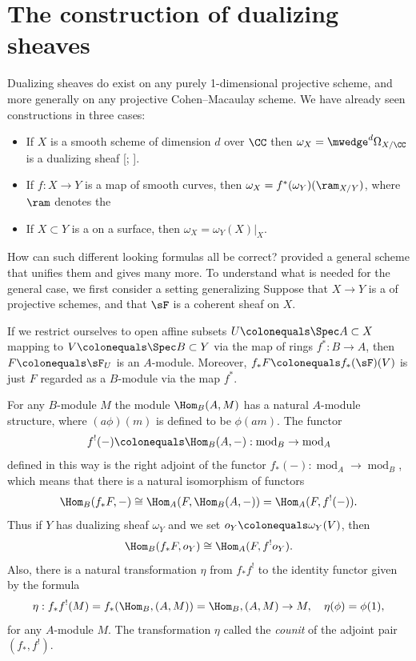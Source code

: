 \section{The construction of dualizing sheaves}
\label{dualizing sheaves section}

Dualizing sheaves do exist on any purely 1-dimensional projective scheme, 
and more generally on any projective Cohen--Macaulay scheme. We
have already seen constructions
in three
cases:

\begin{itemize}
\item If $X$ is a smooth scheme of dimension $d$ over $\CC$ then
$\omega_{X}= \mwedge^{d} \Omega_{X/\CC}$
is a dualizing sheaf
%
[;
\citeyear[p.~648, 708]{Griffiths-Harris1978}].
\item If $f: X\to Y$ is a map of smooth curves, then $\omega_{X} =
f^{*}(\omega_{Y})(\ram_{X/Y})$, where
$\ram$ denotes the
%
\item If $X\subset Y$ is a
%
on a surface, then $\omega_{X}
= \omega_{Y}(X)|_{X}$.
\end{itemize}

How can such different looking formulas all be correct?
%
provided a general scheme
that unifies them and gives many more.
To understand what is needed for the general case, we first consider a
setting generalizing
%
Suppose that $X\to Y$ is a
%
of projective schemes, and that
$\sF$ is a coherent sheaf on $X$.

If we restrict ourselves to open affine subsets
$U \colonequals \Spec A\subset X$ mapping to
$V\colonequals \Spec B\subset Y$ via the map of rings $f^{*}:B\to A$, then
$F \colonequals \sF_{U}$ is an $A$-module. Moreover,
$f_*{F} \colonequals f_*(\sF)(V)$ is just $F$ regarded as a $B$-module
via the map $f^{*}$.

For any $B$-module $M$ the module $\Hom_{B}(A, M)$ has a natural
$A$-module structure,
where $(a\phi)(m)$ is defined to be $\phi(am)$. The functor
%
$$
f^!(-)\colonequals\Hom_{B}(A,-):\operatorname{mod}_B\to\operatorname{mod}_A
$$
defined in this way is the
%
right adjoint of the functor
$f_{*}(-):\operatorname{mod}_{A}\to \operatorname{mod}_{B}$,
which means that there is a natural isomorphism of functors
$$
\Hom_{B}(f_{*}F, -) \cong \Hom_{A}(F, \Hom_{B}(A, -)) = \Hom_{A}(F, f^{!}(-)).
$$
Thus
if $Y$ has dualizing sheaf $\omega_Y$ and we set
$o_Y \colonequals \omega_Y(V)$, then
$$
\Hom_{B}(f_{*}F, o_{Y}) \cong \Hom_{A}(F, f^{!}o_{Y}).
$$
Also, there is a natural transformation $\eta$ from $ f_{*}f^{!}$ to
the identity functor given by the formula
$$
\eta: f_{*}f^{!}(M) = f_{*}(\Hom_{B}, (A,M)) = \Hom_{B}, (A,M) \to M,
\quad\eta(\phi) = \phi(1),
$$
for any $A$-module $M$.
The transformation $\eta$ called the
%
%
\emph{counit} of the adjoint pair
$(f_{*}, f^{!})$.

